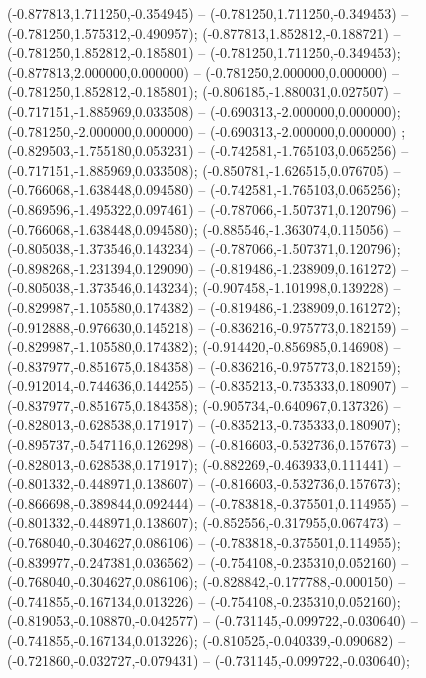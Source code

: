  (-0.877813,1.711250,-0.354945) -- (-0.781250,1.711250,-0.349453) -- (-0.781250,1.575312,-0.490957);
 (-0.877813,1.852812,-0.188721) -- (-0.781250,1.852812,-0.185801) -- (-0.781250,1.711250,-0.349453);
 (-0.877813,2.000000,0.000000) -- (-0.781250,2.000000,0.000000) -- (-0.781250,1.852812,-0.185801);
 (-0.806185,-1.880031,0.027507) -- (-0.717151,-1.885969,0.033508) -- (-0.690313,-2.000000,0.000000);
 (-0.781250,-2.000000,0.000000) -- (-0.690313,-2.000000,0.000000) ;
 (-0.829503,-1.755180,0.053231) -- (-0.742581,-1.765103,0.065256) -- (-0.717151,-1.885969,0.033508);
 (-0.850781,-1.626515,0.076705) -- (-0.766068,-1.638448,0.094580) -- (-0.742581,-1.765103,0.065256);
 (-0.869596,-1.495322,0.097461) -- (-0.787066,-1.507371,0.120796) -- (-0.766068,-1.638448,0.094580);
 (-0.885546,-1.363074,0.115056) -- (-0.805038,-1.373546,0.143234) -- (-0.787066,-1.507371,0.120796);
 (-0.898268,-1.231394,0.129090) -- (-0.819486,-1.238909,0.161272) -- (-0.805038,-1.373546,0.143234);
 (-0.907458,-1.101998,0.139228) -- (-0.829987,-1.105580,0.174382) -- (-0.819486,-1.238909,0.161272);
 (-0.912888,-0.976630,0.145218) -- (-0.836216,-0.975773,0.182159) -- (-0.829987,-1.105580,0.174382);
 (-0.914420,-0.856985,0.146908) -- (-0.837977,-0.851675,0.184358) -- (-0.836216,-0.975773,0.182159);
 (-0.912014,-0.744636,0.144255) -- (-0.835213,-0.735333,0.180907) -- (-0.837977,-0.851675,0.184358);
 (-0.905734,-0.640967,0.137326) -- (-0.828013,-0.628538,0.171917) -- (-0.835213,-0.735333,0.180907);
 (-0.895737,-0.547116,0.126298) -- (-0.816603,-0.532736,0.157673) -- (-0.828013,-0.628538,0.171917);
 (-0.882269,-0.463933,0.111441) -- (-0.801332,-0.448971,0.138607) -- (-0.816603,-0.532736,0.157673);
 (-0.866698,-0.389844,0.092444) -- (-0.783818,-0.375501,0.114955) -- (-0.801332,-0.448971,0.138607);
 (-0.852556,-0.317955,0.067473) -- (-0.768040,-0.304627,0.086106) -- (-0.783818,-0.375501,0.114955);
 (-0.839977,-0.247381,0.036562) -- (-0.754108,-0.235310,0.052160) -- (-0.768040,-0.304627,0.086106);
 (-0.828842,-0.177788,-0.000150) -- (-0.741855,-0.167134,0.013226) -- (-0.754108,-0.235310,0.052160);
 (-0.819053,-0.108870,-0.042577) -- (-0.731145,-0.099722,-0.030640) -- (-0.741855,-0.167134,0.013226);
 (-0.810525,-0.040339,-0.090682) -- (-0.721860,-0.032727,-0.079431) -- (-0.731145,-0.099722,-0.030640);
